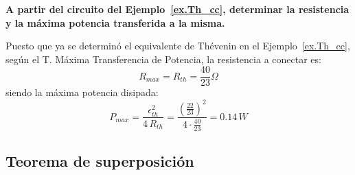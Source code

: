 \documentclass[11pt]{book} %
\begin{document}

\begin{example}\label{ex.tmp_cc}
    \textbf{A partir del circuito del Ejemplo~\ref{ex.Th_cc}, determinar la resistencia y la máxima potencia transferida a la misma.}
    
    Puesto que ya se determinó el equivalente de Thévenin en el Ejemplo~\ref{ex.Th_cc}, según el T. Máxima Transferencia de Potencia, la resistencia a conectar es:
    \begin{equation*}
        R_{max}=R_{th}=\dfrac{40}{23}\Omega
    \end{equation*}
    siendo la máxima potencia disipada:
    \begin{equation*}
        P_{max}=\dfrac{\epsilon_{th}^2}{4\,R_{th}}=\dfrac{(\frac{22}{23})^2}{4\cdot \frac{40}{23}}=0.14\,W
    \end{equation*}
    
\end{example}
	
	\subsection{Teorema de superposición}\label{sec.superposicion_CC}
	
\end{document}
